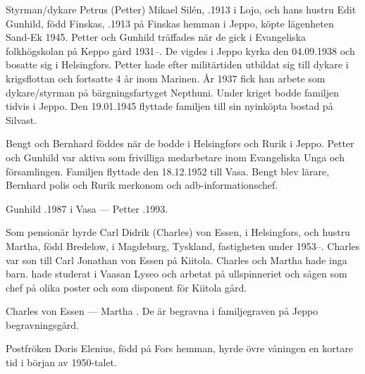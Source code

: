 Styrman/dykare Petrus (Petter) Mikael Silén, .1913 i Lojo, och hans hustru Edit Gunhild, född Finskas, .1913 på Finskas hemman i Jeppo, köpte lägenheten Sand-Ek 1945. Petter och Gunhild träffades när de gick i Evangeliska folkhögskolan på Keppo gård 1931--. De vigdes i Jeppo kyrka den 04.09.1938 och bosatte sig i Helsingfors. Petter hade efter militärtiden utbildat sig till dykare i krigsflottan och fortsatte 4 år inom Marinen. År 1937 fick han arbete som dykare/styrman på bärgningsfartyget Nepthuni. Under kriget bodde familjen tidvis i Jeppo. Den 19.01.1945 flyttade familjen till sin nyinköpta bostad på Silvast.
\begin{jhchildren}
  \item {}
  \item {}
  \item {}
\end{jhchildren}
Bengt och Bernhard föddes när de bodde i Helsingfors och Rurik i Jeppo. Petter och Gunhild var aktiva som frivilliga medarbetare inom Evangeliska Unga och församlingen. Familjen flyttade den 18.12.1952 till Vasa. Bengt blev lärare, Bernhard polis och Rurik merkonom och adb-informationschef.

Gunhild .1987 i Vasa  ---  Petter .1993.


Som pensionär hyrde Carl Didrik (Charles) von Essen,  i Helsingfors, och hustru Martha, född Bredelow,  i Magdeburg, Tyskland, fastigheten under 1953--. Charles var son till Carl Jonathan von Essen på Kiitola. Charles och Martha hade inga barn.  hade studerat i Vaasan Lyseo och arbetat på ullspinneriet och sågen som chef på olika poster och som disponent för Kiitola gård.

Charles von Essen   ---  Martha . De är begravna i familjegraven på Jeppo begravningsgård.

Postfröken Doris Elenius, född på Fors hemman, hyrde övre våningen en kortare tid i början av 1950-talet.

